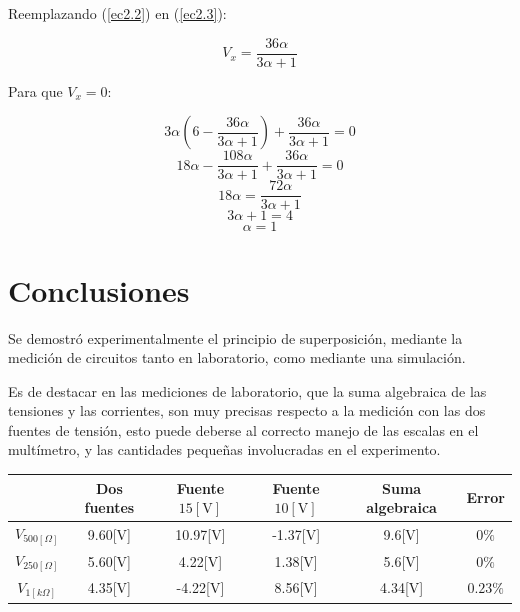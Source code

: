 \documentclass[letter,11pt]{article}
\begin{document}
\begin{enumerate}
Reemplazando (\ref{ec2.2}) en (\ref{ec2.3}):

\begin{equation}
    V_x = \frac{36\alpha}{3\alpha + 1}
    \label{ec2.4}
\end{equation}

Para que $V_x = 0$:

\begin{equation*}
    3\alpha \left(6 - \frac{36\alpha}{3\alpha + 1}\right) + \frac{36\alpha}{3\alpha + 1} = 0
\end{equation*}
\begin{equation*}
    18\alpha - \frac{108\alpha}{3\alpha + 1} + \frac{36\alpha}{3\alpha + 1} = 0
\end{equation*}
\begin{equation*}
    18\alpha = \frac{72\alpha}{3\alpha + 1}
\end{equation*}
\begin{equation*}
    3\alpha + 1 = 4
\end{equation*}
\begin{equation}
    \alpha = 1
\end{equation}

\end{enumerate}

\section{Conclusiones}
Se demostró experimentalmente el principio de superposición, mediante la
medición de circuitos tanto en laboratorio, como mediante una simulación.

Es de destacar en las mediciones de laboratorio, que la suma algebraica de las
tensiones y las corrientes, son muy precisas respecto a la medición con las dos
fuentes de tensión, esto puede deberse al correcto manejo de las escalas en el
multímetro, y las cantidades pequeñas involucradas en el experimento.

\begin{center}
\begin{tabular}{|c||c||c|c|c||c|}
\hline
& \textbf{Dos fuentes} &
    \textbf{Fuente $15[\text{V}]$} &
    \textbf{Fuente $10[\text{V}]$} &
    \textbf{Suma algebraica} &
    \textbf{Error}
\tabularnewline \hline \hline
$V_{500[\Omega]}$ & 9.60[V] & 10.97[V] & -1.37[V] & 9.6[V] & $0\%$
\tabularnewline \hline
$V_{250[\Omega]}$ & 5.60[V] & 4.22[V] & 1.38[V] & 5.6[V] & $0\%$
\tabularnewline \hline
$V_{1[k\Omega]}$ & 4.35[V] & -4.22[V] & 8.56[V] & 4.34[V] & $0.23\%$
\tabularnewline \hline
\end{tabular}
\end{center}
\end{document}
